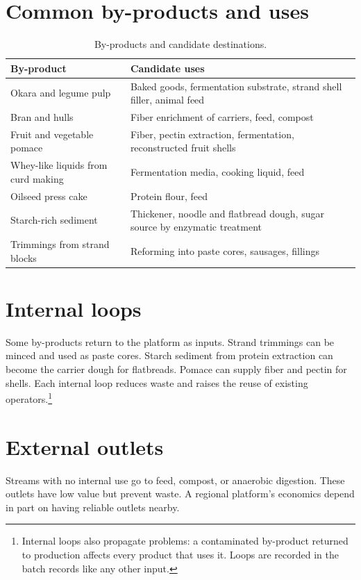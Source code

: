 \documentclass[11pt,openany]{book}
\theoremstyle{definition}
\begin{document}
\section{Common by-products and uses}

\begin{table}[h]
\centering
\begin{tabularx}{\linewidth}{@{}lX@{}}
\toprule
By-product & Candidate uses \\
\midrule
Okara and legume pulp & Baked goods, fermentation substrate, strand shell filler, animal feed \\
Bran and hulls & Fiber enrichment of carriers, feed, compost \\
Fruit and vegetable pomace & Fiber, pectin extraction, fermentation, reconstructed fruit shells \\
Whey-like liquids from curd making & Fermentation media, cooking liquid, feed \\
Oilseed press cake & Protein flour, feed \\
Starch-rich sediment & Thickener, noodle and flatbread dough, sugar source by enzymatic treatment \\
Trimmings from strand blocks & Reforming into paste cores, sausages, fillings \\
\bottomrule
\end{tabularx}
\caption{By-products and candidate destinations.}
\end{table}

\section{Internal loops}

Some by-products return to the platform as inputs. Strand trimmings can be minced and used as paste cores. Starch sediment from protein extraction can become the carrier dough for flatbreads. Pomace can supply fiber and pectin for shells. Each internal loop reduces waste and raises the reuse of existing operators.\footnote{Internal loops also propagate problems: a contaminated by-product returned to production affects every product that uses it. Loops are recorded in the batch records like any other input.}

\section{External outlets}

Streams with no internal use go to feed, compost, or anaerobic digestion. These outlets have low value but prevent waste. A regional platform's economics depend in part on having reliable outlets nearby.
\end{document}
